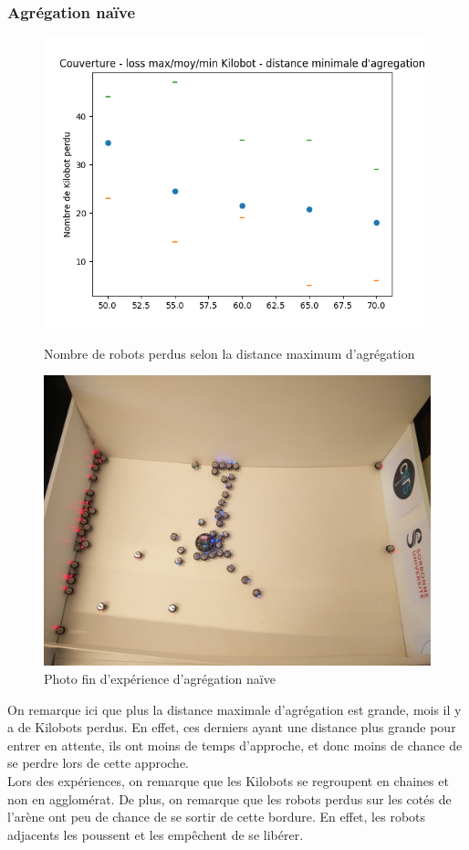 \documentclass[a4paper]{article}
\begin{document}
\subsubsection{Agrégation naïve}
\begin{figure}[h]
	\begin{minipage}[c]{.46\linewidth}
		\centering
		\includegraphics[width=1.1\linewidth]{../../script_results/Agregation_naive_loss}
		\caption{Nombre de robots perdus selon la distance maximum d'agrégation}
	\end{minipage}
	\hfill%
	\begin{minipage}[c]{.46\linewidth}
		\centering
		\includegraphics[width=1.1\linewidth]{../../script_results/Resultats_aggreg_naive.jpg}
		\caption{Photo fin d'expérience d'agrégation naïve}
	\end{minipage}
\end{figure}
On remarque ici que plus la distance maximale d'agrégation est grande, mois il y a de Kilobots perdus. En effet, ces derniers ayant une distance plus grande pour entrer en attente, ils ont moins de temps d'approche, et donc moins de chance de se perdre lors de cette approche.\\
Lors des expériences, on remarque que les Kilobots se regroupent en chaines et non en agglomérat. De plus, on remarque que les robots perdus sur les cotés de l'arène ont peu de chance de se sortir de cette bordure. En effet, les robots adjacents les poussent et les empêchent de se libérer.
\newpage
\end{document}
